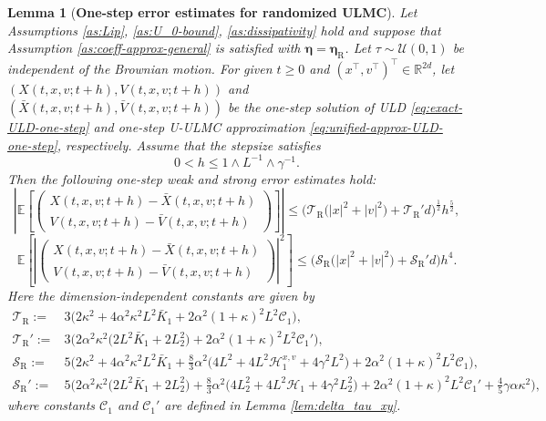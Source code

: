 \documentclass[12pt]{article}
\numberwithin{equation}{section}
\newtheorem{lem}{Lemma}[section]
\begin{document}
\begin{lem}[\textbf{One-step error estimates for randomized ULMC}]
\label{lem:one-step-weak-strong-error}
Let Assumptions \ref{as:Lip}, \ref{as:U_0-bound}, \ref{as:dissipativity} hold and suppose that Assumption \ref{as:coeff-approx-general} is satisfied with $\boldsymbol{\eta}=\boldsymbol{\eta}_\mathrm{R}$. 
Let $\tau\sim {\mathcal U}(0,1)$ be independent of the Brownian motion. 
For given $t\geq0$ and $(x^\top,v^\top)^\top\in\mathbb R^{2d}$, let
\(
(X(t,x,v;t+h),V(t,x,v;t+h))
\)
and 
\(
(\bar X(t,x,v;t+h),\bar V(t,x,v;t+h))
\)
be the one-step solution of ULD \eqref{eq:exact-ULD-one-step} and one-step U-ULMC approximation \eqref{eq:unified-approx-ULD-one-step}, respectively.
Assume that the stepsize satisfies
\[
0<h\leq 1\wedge L^{-1}\wedge \gamma^{-1}.
\]
Then the following one-step weak and strong error estimates hold:
\begin{equation}
\label{eq:one-step-weak-error}
\left|
\mathbb E
\left[
\left(
\begin{aligned}
X(t,x,v;t+h)
-
\bar X(t,x,v;t+h)
\\
V(t,x,v;t+h)
-
\bar V(t,x,v;t+h)
\end{aligned}
\right)
\right]
\right|
\leq
\Big(
\mathcal T_{\mathrm{R}}
\big(
|x|^2+|v|^2
\big)
+
\mathcal T_{\mathrm{R}}'d
\Big)^{\frac{1}{2}}
h^{\frac{5}{2}},
\end{equation}
\begin{equation}
\label{eq:one-step-strong-error}
\mathbb E
\left[
\left|
\left(
\begin{aligned}
X(t,x,v;t+h)-\bar X(t,x,v;t+h)
\\
V(t,x,v;t+h)-\bar V(t,x,v;t+h)
\end{aligned}
\right)
\right|^2
\right]
\leq
\Big(
\mathcal S_{\mathrm{R}}
\big(
|x|^2+|v|^2
\big)
+
\mathcal S_{\mathrm{R}}'d
\Big)h^4.
\end{equation}
Here the dimension-independent constants are given by
\begin{equation}
\label{eq:weak-strong-local-constants}
\begin{aligned}
\mathcal T_{\mathrm{R}}
:=&
3
\Big(
2\kappa^2
+
4\alpha^2\kappa^2L^2\bar K_1
+
2\alpha^2(1+\kappa)^2L^2\mathcal C_1
\Big),
\\
\mathcal T_{\mathrm{R}}'
:=&
3
\Big(
2\alpha^2\kappa^2
\big(
2L^2\bar K_1+2L_2^2
\big)
+
2\alpha^2(1+\kappa)^2L^2\mathcal C_1'
\Big),
\\
\mathcal S_{\mathrm{R}}
:=&
5
\Big(
2\kappa^2
+
4\alpha^2\kappa^2L^2\bar K_1
+
\tfrac{8}{3}\alpha^2
\big(
4L^2
+
4L^2\mathscr H^{x,v}_1
+
4\gamma^2L^2
\big)
+
2\alpha^2(1+\kappa)^2L^2\mathcal C_1
\Big),
\\
\mathcal S_{\mathrm{R}}'
:=&
5
\Big(
2\alpha^2\kappa^2
\big(
2L^2\bar K_1+2L_2^2
\big)
+
\tfrac{8}{3}\alpha^2
\big(
4L_2^2
+
4L^2\mathscr H_1
+
4\gamma^2L_2^2
\big)
+
2\alpha^2(1+\kappa)^2L^2\mathcal C_1'
+
\tfrac{4}{5}\gamma\alpha\kappa^2
\Big),
\end{aligned}
\end{equation}
where constants $\mathcal C_1$ and $\mathcal C_1'$ are defined in Lemma \ref{lem:delta_tau_xy}.
\end{lem}
\end{document}
